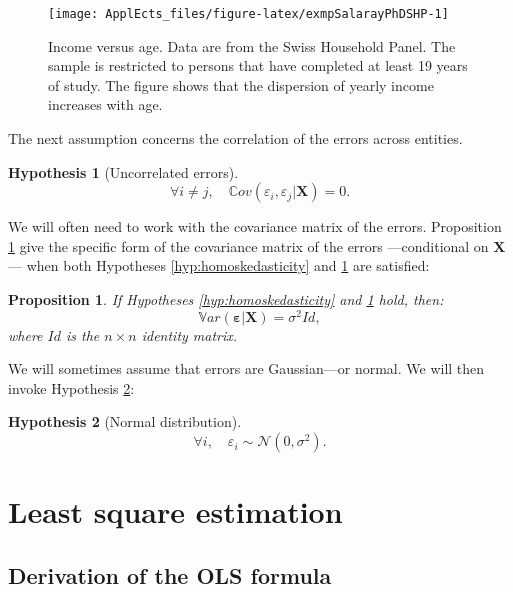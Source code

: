 \documentclass[
  12pt,
]{book}
\newtheorem{proposition}{Proposition}[chapter]
\theoremstyle{definition}
\theoremstyle{definition}
\theoremstyle{definition}
\theoremstyle{definition}
\newtheorem{hypothesis}{Hypothesis}[chapter]
\theoremstyle{remark}
\begin{document}
\begin{figure}
\texttt{[image: ApplEcts\_files/figure-latex/exmpSalarayPhDSHP-1]} \caption{Income versus age. Data are from the Swiss Household Panel. The sample is restricted to persons that have completed at least 19 years of study. The figure shows that the dispersion of yearly income increases with age.}\label{fig:exmpSalarayPhDSHP}
\end{figure}

The next assumption concerns the correlation of the errors across entities.

\begin{hypothesis}[Uncorrelated errors]
\protect\hypertarget{hyp:noncorrelResid}{}\label{hyp:noncorrelResid}\[
\forall i \ne j, \quad \mathbb{C}ov(\varepsilon_i,\varepsilon_j|\mathbf{X})=0.
\]
\end{hypothesis}

We will often need to work with the covariance matrix of the errors. Proposition \ref{prp:Sigma} give the specific form of the covariance matrix of the errors ---conditional on \(\mathbf{X}\)--- when both Hypotheses \ref{hyp:homoskedasticity} and \ref{hyp:noncorrelResid} are satisfied:

\begin{proposition}
\protect\hypertarget{prp:Sigma}{}\label{prp:Sigma}If Hypotheses \ref{hyp:homoskedasticity} and \ref{hyp:noncorrelResid} hold, then:
\[
\mathbb{V}ar(\boldsymbol\varepsilon|\mathbf{X})= \sigma^2 Id,
\]
where \(Id\) is the \(n \times n\) identity matrix.
\end{proposition}

We will sometimes assume that errors are Gaussian---or normal. We will then invoke Hypothesis \ref{hyp:normality}:

\begin{hypothesis}[Normal distribution]
\protect\hypertarget{hyp:normality}{}\label{hyp:normality}\[
\forall i, \quad \varepsilon_i \sim \mathcal{N}(0,\sigma^2).
\]
\end{hypothesis}

\hypertarget{LSquares}{%
\section{Least square estimation}\label{LSquares}}

\hypertarget{derivation-of-the-ols-formula}{%
\subsection{Derivation of the OLS formula}\label{derivation-of-the-ols-formula}}
\end{document}
